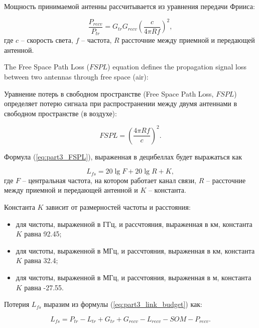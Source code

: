 Мощность принимаемой антенны рассчитывается из уравнения передачи Фрииса:

\begin{displaymath}
  \label{eq:part3_Friis}
  \frac{P_{recv}}{P_{tr}} = G_{tr}G_{recv}\left(\frac{c}{4\pi R f} \right)^2,
\end{displaymath}
где
$c$ --  скорость света,
$f$ -- частота, 
$R$ рассточние между приемной и передающей антенной.

The Free Space Path Loss ($ FSPL $) equation defines the propagation signal loss between two antennas through free space (air):

Уравнение потерь в свободном пространстве (Free Space Path Loss, $FSPL $) определяет потерю сигнала при распространении между двумя антеннами в свободном пространстве (в воздухе):

\begin{equation}
  \label{eq:part3_FSPL}
  FSPL = \left(\frac{4\pi R f}{c} \right)^2.
\end{equation}

Формула (\cref{eq:part3_FSPL}), выраженная в децибеллах будет выражаться как

\begin{equation}
  \label{eq:part3_L_fs}
  L_{fs} = 20 \lg{F} + 20\lg{R} + K,
  \end{equation}
где $F$ -- центральная частота, на котором работает канал связи, $R$ -- рассточние между приемной и передающей антенной и $K$ -- константа.

Константа $K$ зависит от размерностей частоты и расстояния:

\begin{itemize}
  \item для чистоты, выраженной в ГГц, и рассчтояния, выраженная в км, константа $K$ равна 92.45;
  \item для чистоты, выраженной в МГц, и рассчтояния, выраженная в км, константа $K$ равна 32.4;
  \item для чистоты, выраженной в МГц, и рассчтояния, выраженная в м, константа $K$ равна -27.55.
\end{itemize} 

Потерия $L_{fs}$ выразим из формулы (\cref{eq:part3_link_budget}) как:

\begin{equation}
  \label{eq:part3_L_fs_from_link_budget}
  L_{fs} = P_{tr} - L_{tr} + G_{tr} + G_{recv} - L_{recv} - SOM - P_{recv}.
\end{equation}

